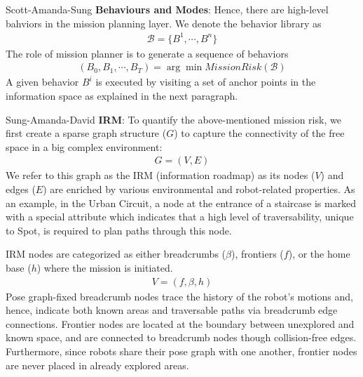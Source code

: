 \documentclass[a4paper, 10pt, conference]{ieeeconf}      %
\newcommand{\ph}[1]{{\textbf{#1}:}} %
\newcommand{\todo}[1]{{\color{red} #1 }} %
\newcommand{\inst}[1]{{\color{orange} #1 }} %
\begin{document}
\todo{Scott-Amanda-Sung} \ph{Behaviours and Modes}
Hence, there are high-level bahviors in the mission planning layer. We denote the behavior library as
\begin{align}
    \mathcal{B} = \{B^1,\cdots,B^n \}
\end{align}
The role of mission planner is to generate a sequence of behaviors
\begin{align}
    (B_0,B_1,\cdots,B_T) = \arg\min MissionRisk(\mathcal{B})
\end{align}
A given behavior $B^i$ is executed by visiting a set of anchor points in the information space as explained in the next paragraph. 


\todo{Sung-Amanda-David} \ph{IRM} To quantify the above-mentioned mission risk, we first create a sparse graph structure ($G$) to capture the connectivity of the free space in a big complex environment:
\begin{align}
    G = (V, E)
\end{align}
We refer to this graph as the IRM (information roadmap) as its nodes ($V$) and edges ($E$) are enriched by various environmental and robot-related properties. As an example, in the Urban Circuit, a node at the entrance of a staircase is marked with a special attribute which indicates that a high level of traversability, unique to Spot, is required to plan paths through this node. 

IRM nodes are categorized as either breadcrumbs ($\beta$), frontiers ($f$), or the home base ($h$) where the mission is initiated. 
\begin{align}
    V = (f, \beta, h)
\end{align}
Pose graph-fixed breadcrumb nodes trace the history of the robot's motions and, hence, indicate both known areas and traversable paths via breadcrumb edge connections. Frontier nodes are located at the boundary between unexplored and known space, and are connected to breadcrumb nodes though collision-free edges. Furthermore, since robots share their pose graph with one another, frontier nodes are never placed in already explored areas.  
\end{document}
